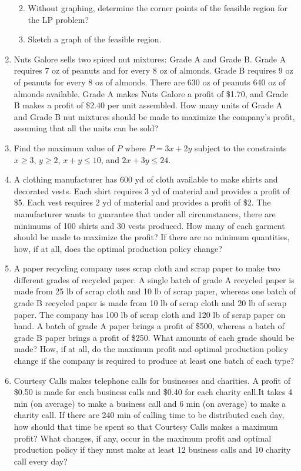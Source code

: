 \documentclass[
  letterpaper,
  DIV=11,
  numbers=noendperiod]{scrreprt}
\providecommand{\tightlist}{%
  \setlength{\itemsep}{0pt}\setlength{\parskip}{0pt}}\usepackage{longtable,booktabs,array}
\begin{document}
\begin{enumerate}
  \begin{enumerate}
  \def\labelenumii{\alph{enumii})}
  \tightlist
  \item
    Without graphing, determine the corner points of the feasible region
    for the LP problem?
  \item
    Sketch a graph of the feasible region.
  \end{enumerate}
\item
  Nuts Galore sells two spiced nut mixtures: Grade A and Grade B. Grade
  A requires 7 oz of peanuts and for every 8 oz of almonds. Grade B
  requires 9 oz of peanuts for every 8 oz of almonds. There are 630 oz
  of peanuts 640 oz of almonds available. Grade A makes Nuts Galore a
  profit of \$1.70, and Grade B makes a profit of \$2.40 per unit
  assembled. How many units of Grade A and Grade B nut mixtures should
  be made to maximize the company's profit, assuming that all the units
  can be sold?
\item
  Find the maximum value of \(P\) where \(P=3x+2y\) subject to the
  constraints \(x\ge3\), \(y\ge2\), \(x+y\le10\), and \(2x+3y\le24\).
\item
  A clothing manufacturer has 600 yd of cloth available to make shirts
  and decorated vests. Each shirt requires 3 yd of material and provides
  a profit of \$5. Each vest requires 2 yd of material and provides a
  profit of \$2. The manufacturer wants to guarantee that under all
  circumstances, there are minimums of 100 shirts and 30 vests produced.
  How many of each garment should be made to maximize the profit? If
  there are no minimum quantities, how, if at all, does the optimal
  production policy change?
\item
  A paper recycling company uses scrap cloth and scrap paper to make two
  different grades of recycled paper. A single batch of grade A recycled
  paper is made from 25 lb of scrap cloth and 10 lb of scrap paper,
  whereas one batch of grade B recycled paper is made from 10 lb of
  scrap cloth and 20 lb of scrap paper. The company has 100 lb of scrap
  cloth and 120 lb of scrap paper on hand. A batch of grade A paper
  brings a profit of \$500, whereas a batch of grade B paper brings a
  profit of \$250. What amounts of each grade should be made? How, if at
  all, do the maximum profit and optimal production policy change if the
  company is required to produce at least one batch of each type?
\item
  Courtesy Calls makes telephone calls for businesses and charities. A
  profit of \$0.50 is made for each business calls and \$0.40 for each
  charity call.It takes 4 min (on average) to make a business call and 6
  min (on average) to make a charity call. If there are 240 min of
  calling time to be distributed each day, how should that time be spent
  so that Courtesy Calls makes a maximum profit? What changes, if any,
  occur in the maximum profit and optimal production policy if they must
  make at least 12 business calls and 10 charity call every day?
\end{enumerate}
\end{document}
